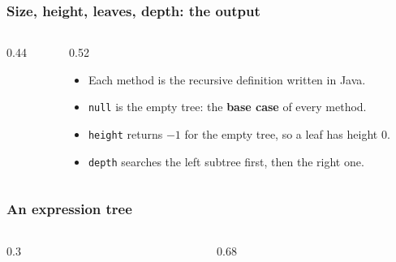 \documentclass[aspectratio=169,10pt,compress]{beamer}
\begin{document}
\begin{frame}[t,fragile] \frametitle{Size, height, leaves, depth: the output}
  \begin{columns}[T]
    \begin{column}{0.44\textwidth}
    \end{column}
    \begin{column}{0.52\textwidth}
      \begin{itemize}\small
        \item Each method is the recursive definition written in Java.
        \item \texttt{null} is the empty tree: the \textbf{base case} of every method.
        \item \texttt{height} returns $-1$ for the empty tree, so a leaf has height $0$.
        \item \texttt{depth} searches the left subtree first, then the right one.
      \end{itemize}
    \end{column}
  \end{columns}
\end{frame}





\begin{frame}[t,fragile] \frametitle{An expression tree}
  \begin{columns}[T]
    \begin{column}{0.3\textwidth}
      \begin{center}
      \end{center}
    \end{column}
    \begin{column}{0.68\textwidth}
    \end{column}
  \end{columns}
\end{frame}
\end{document}
